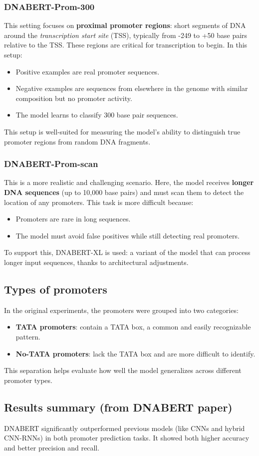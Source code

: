\subsubsection{DNABERT-Prom-300}
This setting focuses on \textbf{proximal promoter regions}: short segments of DNA around the \textit{transcription start site} (TSS), typically from -249 to +50 base pairs relative to the TSS. These regions are critical for transcription to begin.  
In this setup:
\begin{itemize}
\item Positive examples are real promoter sequences.
\item Negative examples are sequences from elsewhere in the genome with similar composition but no promoter activity.
\item The model learns to classify 300 base pair sequences.
\end{itemize}

This setup is well-suited for measuring the model's ability to distinguish true promoter regions from random DNA fragments.

\subsubsection{DNABERT-Prom-scan}
This is a more realistic and challenging scenario. Here, the model receives \textbf{longer DNA sequences} (up to 10,000 base pairs) and must scan them to detect the location of any promoters.  
This task is more difficult because:
\begin{itemize}
\item Promoters are rare in long sequences.
\item The model must avoid false positives while still detecting real promoters.
\end{itemize}

To support this, DNABERT-XL is used: a variant of the model that can process longer input sequences, thanks to architectural adjustments.

\subsection{Types of promoters}

In the original experiments, the promoters were grouped into two categories:
\begin{itemize}
\item \textbf{TATA promoters}: contain a TATA box, a common and easily recognizable pattern.
\item \textbf{No-TATA promoters}: lack the TATA box and are more difficult to identify.
\end{itemize}

This separation helps evaluate how well the model generalizes across different promoter types.

\subsection{Results summary (from DNABERT paper)}

DNABERT significantly outperformed previous models (like CNNs and hybrid CNN-RNNs) in both promoter prediction tasks. It showed both higher accuracy and better precision and recall.